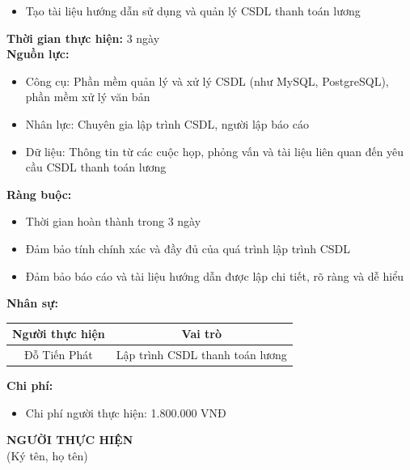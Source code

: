 {\begin{minipage}{\textwidth}
\begin{itemize}
        \item Tạo tài liệu hướng dẫn sử dụng và quản lý CSDL thanh toán lương
    \end{itemize}
    \vspace{0.5cm}
    \noindent \textbf{Thời gian thực hiện:} 3 ngày \\
    \noindent \textbf{Nguồn lực:}
    \begin{itemize}
        \item Công cụ: Phần mềm quản lý và xử lý CSDL (như MySQL, PostgreSQL), phần mềm xử lý văn bản
        \item Nhân lực: Chuyên gia lập trình CSDL, người lập báo cáo
        \item Dữ liệu: Thông tin từ các cuộc họp, phỏng vấn và tài liệu liên quan đến yêu cầu CSDL thanh toán lương
    \end{itemize}
    \vspace{0.5cm}
    \noindent \textbf{Ràng buộc:}
    \begin{itemize}
        \item Thời gian hoàn thành trong 3 ngày
        \item Đảm bảo tính chính xác và đầy đủ của quá trình lập trình CSDL
        \item Đảm bảo báo cáo và tài liệu hướng dẫn được lập chi tiết, rõ ràng và dễ hiểu
    \end{itemize}
    \vspace{0.5cm}
    \noindent \textbf{Nhân sự:}
    \begin{longtable}{|c|c|}
    \hline
    \textbf{Người thực hiện} & \textbf{Vai trò} \\
    \hline
    Đỗ Tiến Phát & Lập trình CSDL thanh toán lương \\
    \hline
    \end{longtable}
    \vspace{0.5cm}
    \noindent \textbf{Chi phí:}
    \begin{itemize}
        \item Chi phí người thực hiện: 1.800.000 VNĐ
    \end{itemize}
    \vspace{1cm}
    \begin{flushleft}
        \hspace{8cm} \textbf{NGƯỜI THỰC HIỆN} \\
        \hspace{8.8cm} (Ký tên, họ tên) \\
        \vspace{1cm}
    \end{flushleft}
    \end{minipage}
}
% 
